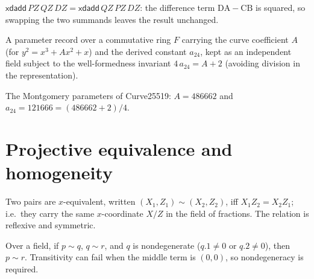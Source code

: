 \begin{lemma}
  \label{lem:xdadd-symm}
  \leanok
  $\mathsf{xdadd}\,PZ\,QZ\,DZ = \mathsf{xdadd}\,QZ\,PZ\,DZ$: the difference
  term $\mathrm{DA}-\mathrm{CB}$ is squared, so swapping the two summands
  leaves the result unchanged.
\end{lemma}

\begin{definition}
  \label{def:monty-params}
  \leanok
  A parameter record over a commutative ring $F$ carrying the curve
  coefficient $A$ (for $y^2 = x^3 + A x^2 + x$) and the derived constant
  $a_{24}$, kept as an independent field subject to the well-formedness
  invariant $4\,a_{24} = A + 2$ (avoiding division in the representation).
\end{definition}

\begin{definition}
  \label{def:curve25519-params}
  \leanok
  The Montgomery parameters of Curve25519: $A = 486662$ and
  $a_{24} = 121666 = (486662 + 2)/4$.
\end{definition}

\section{Projective equivalence and homogeneity}

\begin{definition}
  \label{def:proj-equiv}
  \leanok
  Two pairs are $x$-equivalent, written $(X_1,Z_1) \sim (X_2,Z_2)$, iff
  $X_1 Z_2 = X_2 Z_1$; i.e.\ they carry the same $x$-coordinate
  $X/Z$ in the field of fractions. The relation is reflexive and
  symmetric.
\end{definition}

\begin{lemma}
  \label{lem:proj-equiv-trans}
  \leanok
  Over a field, if $p \sim q$, $q \sim r$, and $q$ is nondegenerate
  ($q.1 \neq 0$ or $q.2 \neq 0$), then $p \sim r$. Transitivity can fail
  when the middle term is $(0,0)$, so nondegeneracy is required.
\end{lemma}

